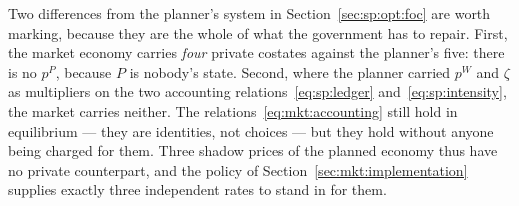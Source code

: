 Two differences from the planner's system in Section~\ref{sec:sp:opt:foc} are worth marking, because
they are the whole of what the government has to repair. First, the market economy carries \emph{four}
private costates against the planner's five: there is no $p^P$, because $P$ is nobody's state. Second,
where the planner carried $p^W$ and $\zeta$ as multipliers on the two accounting
relations~\eqref{eq:sp:ledger} and~\eqref{eq:sp:intensity}, the market carries neither. The
relations~\eqref{eq:mkt:accounting} still hold in equilibrium --- they are identities, not choices ---
but they hold without anyone being charged for them. Three shadow prices of the planned economy thus
have no private counterpart, and the policy of Section~\ref{sec:mkt:implementation} supplies exactly
three independent rates to stand in for them.
